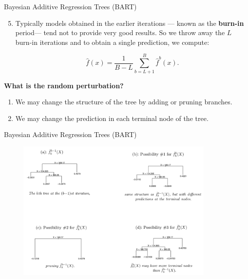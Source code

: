 \begin{frame}{Bayesian Additive Regression Trees (BART)}

\begin{enumerate}
    \setcounter{enumi}{4}
    \item Typically  models obtained in the earlier iterations — known as the \textbf{burn-in} period— tend not to provide very good results. So we throw away the $L$ burn-in iterations and to obtain a single prediction, we compute: \pause 

    \begin{equation*}
        \hat{f}(x) = \frac{1}{B-L} \sum_{b=L+1}^B \hat{f}^b(x). 
    \end{equation*} \pause 
    
\end{enumerate}

\textbf{What is the random perturbation?} \pause 

\begin{enumerate}
    \item We may change the structure of the tree by adding or pruning branches. \pause 

    \item We may change the prediction in each terminal node of the tree. 
\end{enumerate}

    
\end{frame}

\begin{frame}{Bayesian Additive Regression Trees (BART)}

\begin{figure}
    \centering
    \includegraphics[height=7cm]{bagging-boosting/barts-random.png}
    
\end{figure}
    
\end{frame}